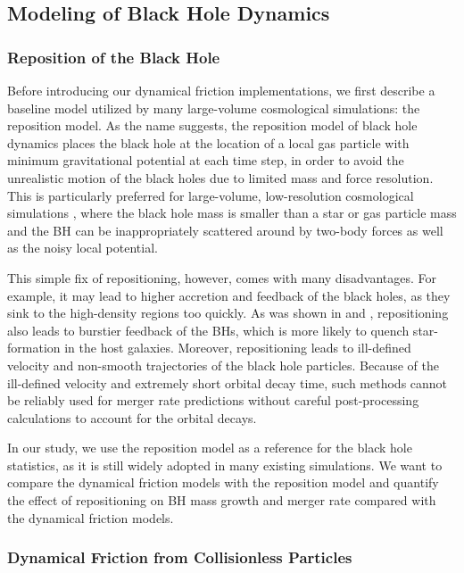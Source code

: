 \subsection{Modeling of Black Hole Dynamics}
\label{subsec:df}
\subsubsection{Reposition of the Black Hole}

Before introducing our dynamical friction implementations, we first describe a baseline model utilized by many large-volume cosmological simulations: the reposition model. As the name suggests, the reposition model of black hole dynamics places the black hole at the location of a local gas particle with minimum gravitational potential at each time step, in order to avoid the unrealistic motion of the black holes due to limited mass and force resolution. This is particularly preferred for large-volume, low-resolution cosmological simulations \citep[e.g.][]{Springel2005b, Sijacki2007, Booth2009,Schaye2015,Pillepich2018}, where the black hole mass is smaller than a star or gas particle mass and the BH can be inappropriately scattered around by two-body forces as well as the noisy local potential.

This simple fix of repositioning, however, comes with many disadvantages. For example, it may lead to higher accretion and feedback of the black holes, as they sink to the high-density regions too quickly. As was shown in \cite{Wurster2013} and \cite{Tremmel2017}, repositioning also leads to burstier feedback of the BHs, which is more likely to quench star-formation in the host galaxies. Moreover, repositioning leads to ill-defined velocity and non-smooth trajectories of the black hole particles. Because of the ill-defined velocity and extremely short orbital decay time, such methods cannot be reliably used for merger rate predictions without careful post-processing calculations to account for the orbital decays.

In our study, we use the reposition model as a reference for the black hole statistics, as it is still widely adopted in many existing simulations. We want to compare the dynamical friction models with the reposition model and quantify the effect of repositioning on BH mass growth and merger rate compared with the dynamical friction models.


\subsubsection{Dynamical Friction from Collisionless Particles}

